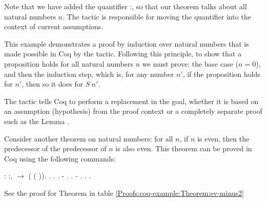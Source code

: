 Note that we have added the quantifier \coqdockw{\ensuremath{\forall}} :, so that our theorem talks about all natural numbers $ n $. The tactic  is responsible for moving the quantifier into the context of current assumptions.

This example demonstrates a proof by induction over natural numbers that is made possible in Coq by the  tactic. Following this principle, to show that a proposition holds for all natural numbers $ n $ we must prove: the base case ($ n = 0 $), and then the induction step, which is, for any number $ n' $, if the proposition holds for $ n' $, then so it does for $ S \ n' $.

The tactic  tells Coq to perform a replacement in the goal, whether it is based on an assumption (hypothesis) from the proof context or a completely separate proof such as the Lemma .

Consider another theorem on natural numbers: for all $ n $, if $ n $ is even, then the predecessor of the predecessor of $ n $ is also even. This theorem can be proved in Coq using the following commands:

\begin{coqdoccode}
	\coqdocnoindent
	  : \coqdockw{\ensuremath{\forall}} :,\coqdoceol
	\coqdocindent{1.00em}
	  \ensuremath{\rightarrow}  ( ( )).\coqdoceol
	\coqdocnoindent
	.\coqdoceol
	\coqdocindent{1.00em}
	.\coqdoceol
	\coqdocindent{1.00em}
	 .\coqdoceol
	\coqdocindent{1.00em}
	- .  .\coqdoceol
	\coqdocindent{1.00em}
	- .  .\coqdoceol
	\coqdocnoindent
	.\coqdoceol
\end{coqdoccode}

\noindent See the proof for Theorem  in table \ref{Proofs:coq-example:Theorem:ev-minus2}

